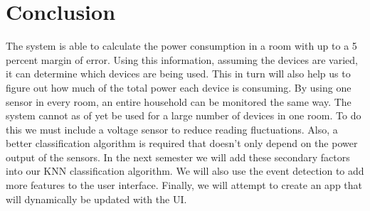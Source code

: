 \chapter{\Large{Conclusion}} \label{con}
The system is able to calculate the power consumption in a room with up to a 5 percent margin of error. Using this information, assuming the devices are varied, it can determine which devices are being used. This in turn will also help us to figure out how much of the total power each device is consuming. By using one sensor in every room, an entire household can be monitored the same way.
The system cannot as of yet be used for a large number of devices in one room. To do this we must include a voltage sensor to reduce reading fluctuations. Also, a better classification algorithm is required that doesn't only depend on the power output of the sensors.
In the next semester we will add these secondary factors into our KNN classification algorithm. We will also use the event detection to add more features to the user interface. Finally, we will attempt to create an app that will dynamically be updated with the UI.